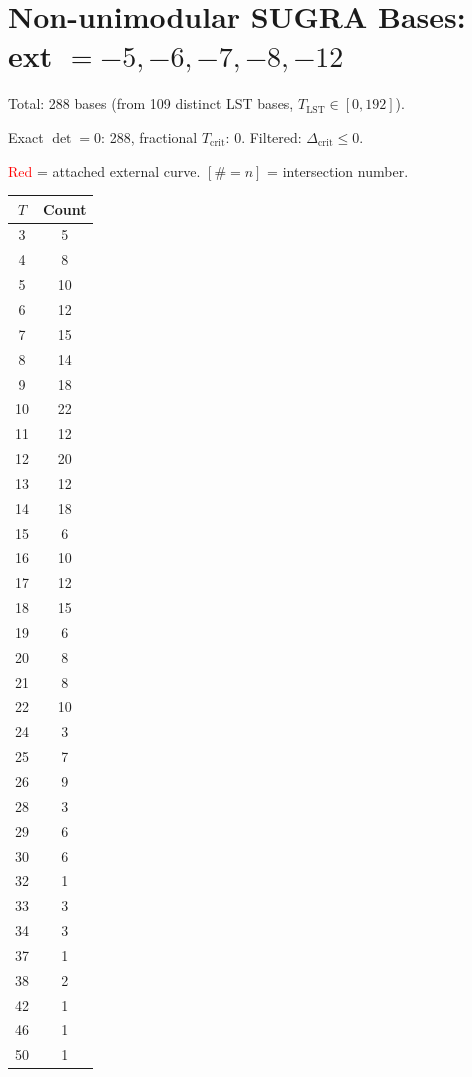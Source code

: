 \documentclass[10pt]{article}
\begin{document}
\section*{Non-unimodular SUGRA Bases: ext $= -5, -6, -7, -8, -12$}

Total: 288 bases (from 109 distinct LST bases, $T_{\text{LST}} \in [0, 192]$).

Exact $\det=0$: 288, fractional $T_{\text{crit}}$: 0. Filtered: $\Delta_{\text{crit}} \leq 0$.

\textcolor{red}{Red} = attached external curve. $\scriptstyle [\#=n]$ = intersection number.

\begin{center}
\begin{tabular}{c|c}
\toprule
$T$ & Count \\
\midrule
3 & 5 \\
4 & 8 \\
5 & 10 \\
6 & 12 \\
7 & 15 \\
8 & 14 \\
9 & 18 \\
10 & 22 \\
11 & 12 \\
12 & 20 \\
13 & 12 \\
14 & 18 \\
15 & 6 \\
16 & 10 \\
17 & 12 \\
18 & 15 \\
19 & 6 \\
20 & 8 \\
21 & 8 \\
22 & 10 \\
24 & 3 \\
25 & 7 \\
26 & 9 \\
28 & 3 \\
29 & 6 \\
30 & 6 \\
32 & 1 \\
33 & 3 \\
34 & 3 \\
37 & 1 \\
38 & 2 \\
42 & 1 \\
46 & 1 \\
50 & 1 \\
\bottomrule
\end{tabular}

\end{center}
\end{document}
